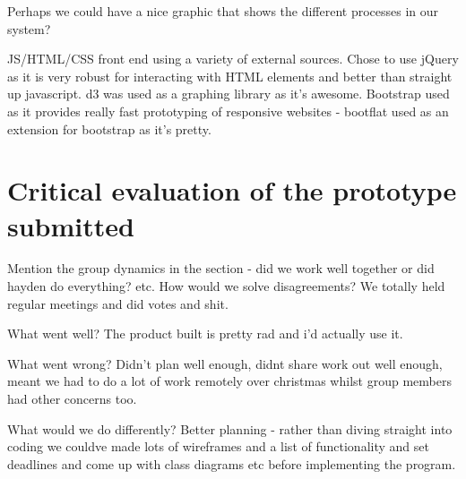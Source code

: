 \documentclass[12pt, a4paper]{article}
\begin{document}
Perhaps we could have a nice graphic that shows the different processes in our system?

JS/HTML/CSS front end using a variety of external sources. Chose to use jQuery as it is very robust for interacting with HTML elements and better than straight up javascript. d3 was used as a graphing library as it's awesome. Bootstrap used as it provides really fast prototyping of responsive websites - bootflat used as an extension for bootstrap as it's pretty.

\newpage	
\section{Critical evaluation of the prototype submitted}
Mention the group dynamics in the section - did we work well together or did hayden do everything? etc. How would we solve disagreements? We totally held regular meetings and did votes and shit. 

What went well?
The product built is pretty rad and i'd actually use it.

What went wrong?
Didn't plan well enough, didnt share work out well enough, meant we had to do a lot of work remotely over christmas whilst group members had other concerns too.

What would we do differently?
Better planning - rather than diving straight into coding we couldve made lots of wireframes and a list of functionality and set deadlines and come up with class diagrams etc before implementing the program.
\end{document}
